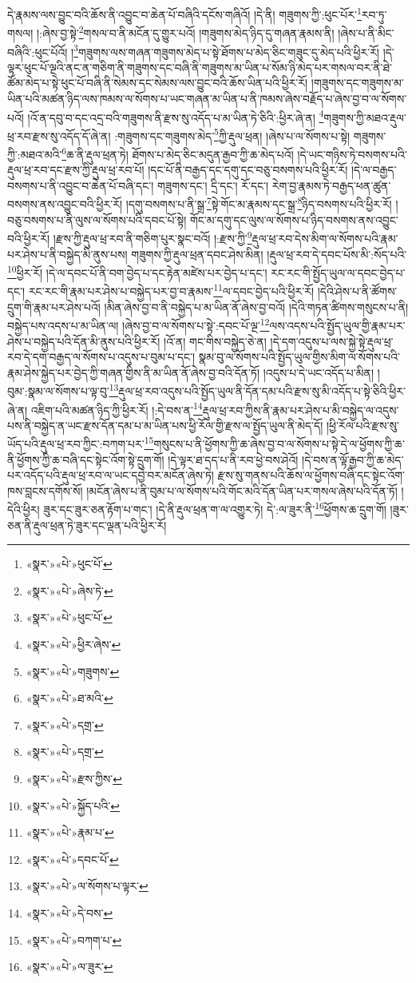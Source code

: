 དེ་རྣམས་ལས་བྱུང་བའི་ཆོས་ནི་འབྱུང་བ་ཆེན་པོ་བཞིའི་དངོས་གཞིའོ། །དེ་ནི། གཟུགས་ཀྱི་:ཕུང་པོར་\footnote{«སྣར་»«པེ་»ཕུང་པོ་}རབ་ཏུ་གསལ། །:ཞེས་བྱ་སྟེ་\footnote{«སྣར་»«པེ་»ཞེས་ཏེ་}གསལ་བ་ནི་མངོན་དུ་གྱུར་པའོ། །གཟུགས་མེད་ཉིད་དུ་གཞན་རྣམས་ནི། །ཞེས་པ་ནི་མིང་བཞིའི་:ཕུང་པོའོ། །\footnote{«སྣར་»«པེ་»ཕུང་པོ་}གཟུགས་ལས་གཞན་གཟུགས་མེད་པ་སྟེ་ཐོགས་པ་མེད་ཅིང་གཟུང་དུ་མེད་པའི་ཕྱིར་རོ། །དེ་ལྟར་ཕུང་པོ་ལྔའི་ནང་ན་གཅིག་ནི་གཟུགས་དང་བཞི་ནི་གཟུགས་མ་ཡིན་པ་སོམ་ཉི་མེད་པར་གསལ་བར་ནི་ཐེ་ཚོམ་མེད་པ་སྟེ་ཕུང་པོ་བཞི་ནི་སེམས་དང་སེམས་ལས་བྱུང་བའི་ཆོས་ཡིན་པའི་ཕྱིར་རོ། །གཟུགས་དང་གཟུགས་མ་ཡིན་པའི་མཚན་ཉིད་ལས་ཁམས་ལ་སོགས་པ་ཡང་གཞན་མ་ཡིན་པ་ནི་ཁམས་ཞེས་བརྗོད་པ་ཞེས་བྱ་བ་ལ་སོགས་པའོ། །འོ་ན་དབུ་བ་དང་འདྲ་བའི་གཟུགས་ནི་རྫས་སུ་འདོད་པ་མ་ཡིན་ཏེ་ཅིའི་:ཕྱིར་ཞེ་ན། \footnote{«སྣར་»«པེ་»ཕྱིར་ཞེས་}གཟུགས་ཀྱི་མཐའ་རྡུལ་ཕྲ་རབ་རྫས་སུ་འདོད་དོ་ཞེ་ན། :གཟུགས་དང་གཟུགས་མེད་\footnote{«སྣར་»«པེ་»གཟུགས་}ཀྱི་རྡུལ་ཕྲན། །ཞེས་པ་ལ་སོགས་པ་སྟེ། གཟུགས་ཀྱི་:མཐའ་མའི་\footnote{«སྣར་»«པེ་»ཐ་མའི་}ཆ་ནི་རྡུལ་ཕྲན་ཏེ། ཐོགས་པ་མེད་ཅིང་མདུན་རྒྱབ་ཀྱི་ཆ་མེད་པའོ། །དེ་ཡང་གཉིས་ཏེ་བསགས་པའི་རྡུལ་ཕྲ་རབ་དང་རྫས་ཀྱི་རྡུལ་ཕྲ་རབ་པོ། །དང་པོ་ནི་བརྒྱད་དང་དགུ་དང་བཅུ་བསགས་པའི་ཕྱིར་རོ། །དེ་ལ་བརྒྱད་བསགས་པ་ནི་འབྱུང་བ་ཆེན་པོ་བཞི་དང་། གཟུགས་དང་། དྲི་དང་། རོ་དང་། རེག་བྱ་རྣམས་ཏེ་བརྒྱད་ཕན་ཚུན་བསགས་ནས་འབྱུང་བའི་ཕྱིར་རོ། །དགུ་བསགས་པ་ནི་སྒྲ་\footnote{«སྣར་»«པེ་»དགྲ་}སྟེ་གོང་མ་རྣམས་དང་སྒྲ་\footnote{«སྣར་»«པེ་»དགྲ་}ཉིད་བསགས་པའི་ཕྱིར་རོ། །བཅུ་བསགས་པ་ནི་ལུས་ལ་སོགས་པའི་དབང་པོ་སྟེ། གོང་མ་དགུ་དང་ལུས་ལ་སོགས་པ་ཉིད་བསགས་ནས་འབྱུང་བའི་ཕྱིར་རོ། །རྫས་ཀྱི་རྡུལ་ཕྲ་རབ་ནི་གཅིག་པུར་སྣང་བའོ། །:རྫས་ཀྱི་\footnote{«སྣར་»«པེ་»རྫས་ཀྱིས་}རྡུལ་ཕྲ་རབ་དེས་མིག་ལ་སོགས་པའི་རྣམ་པར་ཤེས་པ་ནི་བསྐྱེད་མི་ནུས་པས། གཟུགས་ཀྱི་རྡུལ་ཕྲན་དབང་ཤེས་མིན། །རྡུལ་ཕྲ་རབ་དེ་དབང་པོས་མི་:སོད་པའི་\footnote{«སྣར་»«པེ་»སྐྱོད་པའི་}ཕྱིར་རོ། །དེ་ལ་དབང་པོ་ནི་བག་བྱེད་པ་དང་རྟེན་མཛེས་པར་བྱེད་པ་དང་། རང་རང་གི་སྤྱོད་ཡུལ་ལ་དབང་བྱེད་པ་དང་། རང་རང་གི་རྣམ་པར་ཤེས་པ་བསྐྱེད་པར་བྱ་བ་རྣམས་\footnote{«སྣར་»«པེ་»རྣམ་པ་}ལ་དབང་བྱེད་པའི་ཕྱིར་རོ། །དེའི་ཤེས་པ་ནི་ཚོགས་དྲུག་གི་རྣམ་པར་ཤེས་པའོ། །མིན་ཞེས་བྱ་བ་ནི་བསྐྱེད་པ་མ་ཡིན་ནོ་ཞེས་བྱ་བའོ། །དེའི་གཏན་ཚིགས་གསུངས་པ་ནི། བསྐྱེད་པས་འདས་པ་མ་ཡིན་ལ། །ཞེས་བྱ་བ་ལ་སོགས་པ་སྟེ་:དབང་པོ་ལྔ་\footnote{«སྣར་»«པེ་»དབང་པོ་}ལས་འདས་པའི་སྤྱོད་ཡུལ་གྱི་རྣམ་པར་ཤེས་པ་བསྐྱེད་པའི་དོན་མི་ནུས་པའི་ཕྱིར་རོ། །འོ་ན། གང་གིས་བསྐྱེད་ཅེ་ན། །དེ་དག་འདུས་པ་ལས་སྐྱེ་སྟེ་རྡུལ་ཕྲ་རབ་དེ་དག་བརྒྱད་ལ་སོགས་པ་འདུས་པ་བུམ་པ་དང་། སྣམ་བུ་ལ་སོགས་པའི་སྤྱོད་ཡུལ་གྱིས་མིག་ལ་སོགས་པའི་རྣམ་ཤེས་སྐྱེད་པར་བྱེད་ཀྱི་གཞན་གྱིས་ནི་མ་ཡིན་ནོ་ཞེས་བྱ་བའི་དོན་ཏོ། །འདུས་པ་དེ་ཡང་འདོད་པ་མིན། །བུམ་:སྣམ་ལ་སོགས་པ་ལྟ་བུ་\footnote{«སྣར་»«པེ་»ལ་སོགས་པ་ལྟར་}རྡུལ་ཕྲ་རབ་འདུས་པའི་སྤྱོད་ཡུལ་ནི་དོན་དམ་པའི་རྫས་སུ་མི་འདོད་པ་སྟེ་ཅིའི་ཕྱིར་ཞེ་ན། འཇིག་པའི་མཚན་ཉིད་ཀྱི་ཕྱིར་རོ། །:དེ་བས་ན་\footnote{«སྣར་»«པེ་»དེ་བས་}རྡུལ་ཕྲ་རབ་ཀྱིས་ནི་རྣམ་པར་ཤེས་པ་མི་བསྐྱེད་ལ་འདུས་པས་ནི་བསྐྱེད་ན་ཡང་རྫས་དོན་དམ་པ་མ་ཡིན་པས་ཕྱི་རོལ་གྱི་རྫས་ལ་སྤྱོད་ཡུལ་ནི་མེད་དོ། །ཕྱི་རོལ་པའི་རྫས་སུ་ཡོད་པའི་རྡུལ་ཕྲ་རབ་ཀྱིང་:བཀག་པར་\footnote{«སྣར་»«པེ་»བཀག་པ་}གསུངས་པ་ནི་ཕྱོགས་ཀྱི་ཆ་ཞེས་བྱ་བ་ལ་སོགས་པ་སྟེ་དེ་ལ་ཕྱོགས་ཀྱི་ཆ་ནི་ཕྱོགས་ཀྱི་ཆ་བཞི་དང་སྟེང་འོག་སྟེ་དྲུག་གོ། །དེ་ལྟར་ཐ་དད་པ་ནི་རབ་ཕྱེ་བས་ཤེའོ། །དེ་བས་ན་ལྟོ་རྒྱབ་ཀྱི་ཆ་མེད་པར་འདོད་པའི་རྡུལ་ཕྲ་རབ་ལ་ཡང་དབྱེ་བར་མངོན་ཞེས་ཏེ། རྫས་སུ་གནས་པའི་ཆོས་ལ་ཕྱོགས་བཞི་དང་སྟེང་འོག་ཁས་བླངས་དགོས་སོ། །མངོན་ཞེས་པ་ནི་བུམ་པ་ལ་སོགས་པའི་གོང་མའི་དོན་ཡིན་པར་གསལ་ཞེས་པའི་དོན་ཏོ། །དེའི་ཕྱིར། ཟུར་དང་ཟུར་ཅན་རྟོག་པ་གང་། །དེ་ནི་རྡུལ་ཕྲན་ག་ལ་འགྱུར་ཏེ། དེ་:ལ་ཟུར་ནི་\footnote{«སྣར་»«པེ་»ལ་ཟུར་}ཕྱོགས་ཆ་དྲུག་གོ། །ཟུར་ཅན་ནི་རྡུལ་ཕྲན་ཏེ་ཟུར་དང་ལྡན་པའི་ཕྱིར་རོ། 